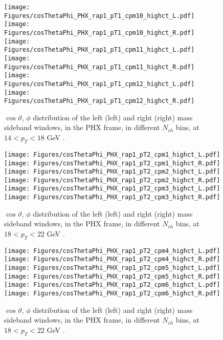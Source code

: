 \documentclass[12pt]{article}
\begin{document}
\begin{figure}[htbp]
\centering
\texttt{[image: Figures/cosThetaPhi\_PHX\_rap1\_pT1\_cpm10\_highct\_L.pdf]}
\texttt{[image: Figures/cosThetaPhi\_PHX\_rap1\_pT1\_cpm10\_highct\_R.pdf]}
\texttt{[image: Figures/cosThetaPhi\_PHX\_rap1\_pT1\_cpm11\_highct\_L.pdf]}
\texttt{[image: Figures/cosThetaPhi\_PHX\_rap1\_pT1\_cpm11\_highct\_R.pdf]}
\texttt{[image: Figures/cosThetaPhi\_PHX\_rap1\_pT1\_cpm12\_highct\_L.pdf]}
\texttt{[image: Figures/cosThetaPhi\_PHX\_rap1\_pT1\_cpm12\_highct\_R.pdf]}
\caption{$\cos\vartheta,\,\phi$ distribution of the left (left) and
  right (right) mass sideband windows, in the PHX frame, in different
  $N_{ch}$ bins, at $14 < p_{T} < 18$ GeV .}
\end{figure}
\clearpage

\begin{figure}[htbp]
\centering
\texttt{[image: Figures/cosThetaPhi\_PHX\_rap1\_pT2\_cpm1\_highct\_L.pdf]}
\texttt{[image: Figures/cosThetaPhi\_PHX\_rap1\_pT2\_cpm1\_highct\_R.pdf]}
\texttt{[image: Figures/cosThetaPhi\_PHX\_rap1\_pT2\_cpm2\_highct\_L.pdf]}
\texttt{[image: Figures/cosThetaPhi\_PHX\_rap1\_pT2\_cpm2\_highct\_R.pdf]}
\texttt{[image: Figures/cosThetaPhi\_PHX\_rap1\_pT2\_cpm3\_highct\_L.pdf]}
\texttt{[image: Figures/cosThetaPhi\_PHX\_rap1\_pT2\_cpm3\_highct\_R.pdf]}
\caption{$\cos\vartheta,\,\phi$ distribution of the left (left) and
  right (right) mass sideband windows, in the PHX frame, in different
  $N_{ch}$ bins, at $18 < p_{T} < 22$ GeV .}
\end{figure}
\clearpage

\begin{figure}[htbp]
\centering
\texttt{[image: Figures/cosThetaPhi\_PHX\_rap1\_pT2\_cpm4\_highct\_L.pdf]}
\texttt{[image: Figures/cosThetaPhi\_PHX\_rap1\_pT2\_cpm4\_highct\_R.pdf]}
\texttt{[image: Figures/cosThetaPhi\_PHX\_rap1\_pT2\_cpm5\_highct\_L.pdf]}
\texttt{[image: Figures/cosThetaPhi\_PHX\_rap1\_pT2\_cpm5\_highct\_R.pdf]}
\texttt{[image: Figures/cosThetaPhi\_PHX\_rap1\_pT2\_cpm6\_highct\_L.pdf]}
\texttt{[image: Figures/cosThetaPhi\_PHX\_rap1\_pT2\_cpm6\_highct\_R.pdf]}
\caption{$\cos\vartheta,\,\phi$ distribution of the left (left) and
  right (right) mass sideband windows, in the PHX frame, in different
  $N_{ch}$ bins, at $18 < p_{T} < 22$ GeV .}
\end{figure}
\clearpage
\end{document}
